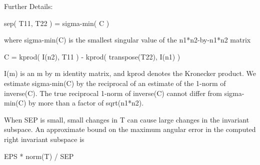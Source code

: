 \begin{DoxyParagraph}{Further Details\+: }
\begin{DoxyVerb}
                     sep( T11, T22 ) = sigma-min( C )

  where sigma-min(C) is the smallest singular value of the
  n1*n2-by-n1*n2 matrix

     C  = kprod( I(n2), T11 ) - kprod( transpose(T22), I(n1) )

  I(m) is an m by m identity matrix, and kprod denotes the Kronecker
  product. We estimate sigma-min(C) by the reciprocal of an estimate of
  the 1-norm of inverse(C). The true reciprocal 1-norm of inverse(C)
  cannot differ from sigma-min(C) by more than a factor of sqrt(n1*n2).

  When SEP is small, small changes in T can cause large changes in
  the invariant subspace. An approximate bound on the maximum angular
  error in the computed right invariant subspace is

                      EPS * norm(T) / SEP\end{DoxyVerb}
 
\end{DoxyParagraph}
